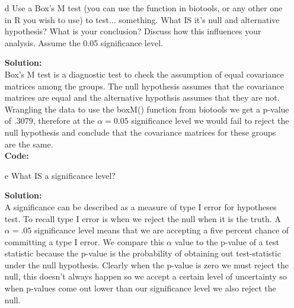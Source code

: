 \documentclass[12pt]{article}
\makeatletter
\theoremstyle{homework}
\newenvironment{exercise}[1]
{\def\@currentlabel{#1}\exercisecore}
{\endexercisecore}
\newcommand{\localhead}[1]{\par\smallskip\noindent\textbf{#1}\nobreak\\}%
\newcommand\solution{\localhead{Solution:}}
\makeatother
\begin{document}
\begin{exercise}{1}
\begin{enumerate}
    \item[d] Use a Box's M test (you can use the function in biotools, or any other one in R you wish to use) to test... something.  
    What IS it's null and alternative hypothesis?  What is your conclusion?  Discuss how this influences your analysis.  Assume the 0.05 significance level.\\
    \solution  Box's M test is a diagnostic test to check the assumption of equal covariance matrices among the groups. The null hypothesis assumes that the covariance matrices 
    are equal and the alternative hypothsis assumes that they are not. Wrangling the data to use the boxM() function from biotools we get a p-value of .3079, therefore at the 
    $\alpha = 0.05$ significance level we would fail to reject the null hypothesis and conclude that the covariance matrices for these groups are the same.\\
    \textbf{Code:}
      \begin{center}
      
      \end{center}
    \vspace{.15in}









    \item[e] What IS a significance level?\\
    \solution A significance can be described as a measure of type I error for hypotheses test. 
    To recall type I error is when we reject the null when it is the truth. A $\alpha = .05$ significance level means 
    that we are accepting a five percent chance of committing a type I error.  We compare this $\alpha$ value to the p-value of a test statistic
    because the p-value is the probability of obtaining out test-statistic under the null hypothesis. Clearly when the p-value is zero we must reject the 
    null, this doesn't always happen so we accept a certain level of uncertainty so when p-values come out lower than our significance level we also reject the null. 
  \end{enumerate}  
\end{exercise}
\vspace{1in}
\end{document}
